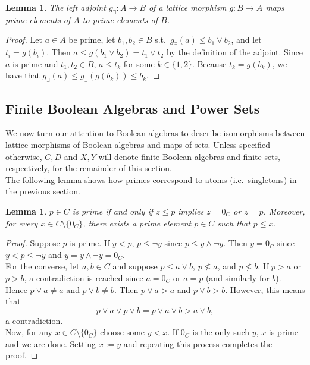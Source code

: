 \documentclass{article}
\newtheorem{lemma}[proposition]{Lemma}
\newcommand{\meet}{\wedge}
\newcommand{\join}{\vee}
\begin{document}
\begin{lemma} \label{lem:left-adjoint-maps-primes-to-primes}
The left adjoint $g_\exists : A \to B$ of a lattice morphism $g : B \to A$ maps prime elements of $A$ to prime elements of $B$.
\end{lemma}

\begin{proof}
Let $a \in A$ be prime, let $b_1, b_2 \in B$ s.t.\ $g_\exists(a) \leq b_1 \join b_2$, and let $t_i = g(b_i)$. Then $a \leq g(b_1 \join b_2) = t_1 \join t_2$ by the definition of the adjoint. Since $a$ is prime and $t_1, t_2 \in B$, $a \leq t_k$ for some $k \in \{1, 2\}$. Because $t_k = g(b_k)$, we have that $g_\exists(a) \leq g_\exists(g(b_k)) \leq b_k$.
\end{proof}

\subsection{Finite Boolean Algebras and Power Sets}

We now turn our attention to Boolean algebras to describe isomorphisms between lattice morphisms of Boolean algebras and maps of sets. Unless specified otherwise, $C, D$ and $X, Y$ will denote finite Boolean algebras and finite sets, respectively, for the remainder of this section. \\

The following lemma shows how primes correspond to atoms (i.e.\ singletons) in the previous section.

\begin{lemma} \label{lem:primes-are-atoms}
$p \in C$ is prime if and only if $z \leq p$ implies $z = 0_C$ or $z = p$. Moreover, for every $x \in C \setminus \{0_C\}$, there exists a prime element $p \in C$ such that $p \leq x$. 
\end{lemma}

\begin{proof}
Suppose $p$ is prime. If $y < p$, $p \leq \neg y$ since $p \leq y \meet \neg y$. Then $y = 0_C$ since $y < p \leq \neg y$ and $y = y \meet \neg y = 0_C$. \\

For the converse, let $a, b \in C$ and suppose $p \leq a \join b$, $p \not\leq a$, and $p \not\leq b$. If $p > a$ or $p > b$, a contradiction is reached since $a = 0_C$ or $a = p$ (and similarly for $b$). Hence $p \join a \neq a$ and $p \join b \neq b$. Then $p \join a > a$ and $p \join b > b$. However, this means that $$p \join a \join p \join b = p \join a \join b > a \join b,$$ a contradiction. \\

Now, for any $x \in C \setminus \{0_C\}$ choose some $y < x$. If $0_C$ is the only such $y$, $x$ is prime and we are done. Setting $x := y$ and repeating this process completes the proof.
\end{proof} 
\end{document}

